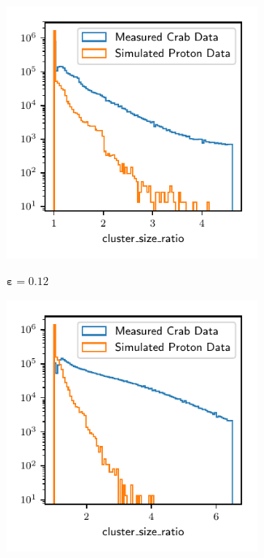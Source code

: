 \begin{figure}
\begin{subfigure}{0.5\textwidth}
    \includegraphics[width=0.9\textwidth, page=2]{Plots/Epsilon/11_comparison.pdf}
  \end{subfigure}
  \begin{subfigure}{0.5\textwidth}
    \centering
    $\symbf{\varepsilon = 0.12}$\par\smallskip
    \includegraphics[width=0.9\textwidth, page=23]{Plots/Epsilon/12_comparison.pdf}

\end{subfigure}
\end{figure}
